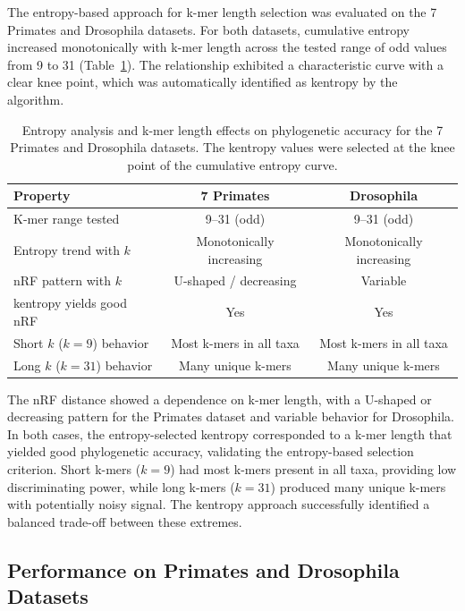 \documentclass[12pt]{article}
\begin{document}
The entropy-based approach for k-mer length selection was evaluated on the 7 Primates and Drosophila datasets. For both datasets, cumulative entropy increased monotonically with k-mer length across the tested range of odd values from 9 to 31 (Table~\ref{tab:entropy}). The relationship exhibited a characteristic curve with a clear knee point, which was automatically identified as kentropy by the algorithm.

\begin{table}[ht]
\centering
\caption{Entropy analysis and k-mer length effects on phylogenetic accuracy for the 7 Primates and Drosophila datasets. The kentropy values were selected at the knee point of the cumulative entropy curve.}
\label{tab:entropy}
\begin{tabular}{lcc}
\toprule
\textbf{Property} & \textbf{7 Primates} & \textbf{Drosophila} \\
\midrule
K-mer range tested & 9--31 (odd) & 9--31 (odd) \\
Entropy trend with $k$ & Monotonically increasing & Monotonically increasing \\
nRF pattern with $k$ & U-shaped / decreasing & Variable \\
kentropy yields good nRF & Yes & Yes \\
Short $k$ ($k=9$) behavior & Most k-mers in all taxa & Most k-mers in all taxa \\
Long $k$ ($k=31$) behavior & Many unique k-mers & Many unique k-mers \\
\bottomrule
\end{tabular}
\end{table}

The nRF distance showed a dependence on k-mer length, with a U-shaped or decreasing pattern for the Primates dataset and variable behavior for Drosophila. In both cases, the entropy-selected kentropy corresponded to a k-mer length that yielded good phylogenetic accuracy, validating the entropy-based selection criterion. Short k-mers ($k=9$) had most k-mers present in all taxa, providing low discriminating power, while long k-mers ($k=31$) produced many unique k-mers with potentially noisy signal. The kentropy approach successfully identified a balanced trade-off between these extremes.

\subsection{Performance on Primates and Drosophila Datasets}
\end{document}
